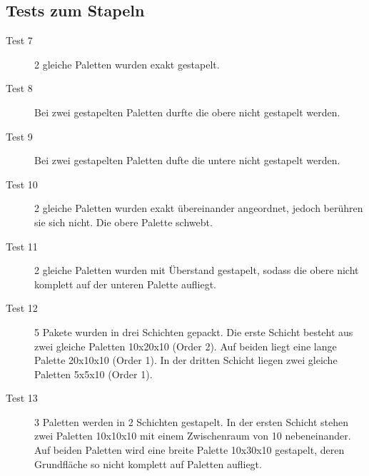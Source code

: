 \documentclass{scrartcl}
\newcommand{\cmark}{\ding{51}}%
\newcommand{\xmark}{\ding{55}}%
\begin{document}
\subsection*{Tests zum Stapeln}
\begin{description}
	\item[Test 7 \cmark] 2 gleiche Paletten wurden exakt gestapelt.
	\item[Test 8 \xmark] Bei zwei gestapelten Paletten durfte die obere nicht gestapelt werden. 
	\item[Test 9 \xmark] Bei zwei gestapelten Paletten dufte die untere nicht gestapelt werden.
	\item[Test 10 \xmark] 2 gleiche Paletten wurden exakt übereinander angeordnet, jedoch berühren sie sich nicht. Die obere Palette \glqq schwebt\grqq.
	\item[Test 11 \xmark] 2 gleiche Paletten wurden mit Überstand gestapelt, sodass die obere nicht komplett auf der unteren Palette aufliegt.
	\item[Test 12 \cmark] 5 Pakete wurden in drei Schichten gepackt. Die erste Schicht besteht aus zwei gleiche Paletten 10x20x10 (Order 2). Auf beiden liegt eine lange Palette 20x10x10 (Order 1). In der dritten Schicht liegen zwei gleiche Paletten 5x5x10 (Order 1).
	\item[Test 13 \xmark] 3 Paletten werden in 2 Schichten gestapelt. In der ersten Schicht stehen zwei Paletten 10x10x10 mit einem Zwischenraum von 10 nebeneinander. Auf beiden Paletten wird eine breite Palette 10x30x10 gestapelt, deren Grundfläche so nicht komplett auf Paletten aufliegt.
	\end{description}
\end{document}
